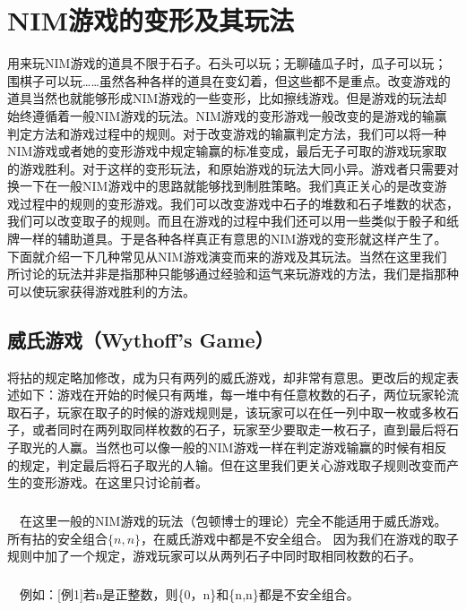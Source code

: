 \documentclass[UTF8,nofonts,cs4size]{ctexrep}
\begin{document}
\chapter{NIM游戏的变形及其玩法}
用来玩NIM游戏的道具不限于石子。石头可以玩；无聊磕瓜子时，瓜子可以玩；围棋子可以玩……虽然各种各样的道具在变幻着，但这些都不是重点。改变游戏的道具当然也就能够形成NIM游戏的一些变形，比如擦线游戏。但是游戏的玩法却始终遵循着一般NIM游戏的玩法。NIM游戏的变形游戏一般改变的是游戏的输赢判定方法和游戏过程中的规则。对于改变游戏的输赢判定方法，我们可以将一种NIM游戏或者她的变形游戏中规定输赢的标准变成，最后无子可取的游戏玩家取的游戏胜利。对于这样的变形玩法，和原始游戏的玩法大同小异。游戏者只需要对换一下在一般NIM游戏中的思路就能够找到制胜策略。我们真正关心的是改变游戏过程中的规则的变形游戏。我们可以改变游戏中石子的堆数和石子堆数的状态，我们可以改变取子的规则。而且在游戏的过程中我们还可以用一些类似于骰子和纸牌一样的辅助道具。于是各种各样真正有意思的NIM游戏的变形就这样产生了。下面就介绍一下几种常见从NIM游戏演变而来的游戏及其玩法。当然在这里我们所讨论的玩法并非是指那种只能够通过经验和运气来玩游戏的方法，我们是指那种可以使玩家获得游戏胜利的方法。
\section{威氏游戏（Wythoff's Game）}
将拈的规定略加修改，成为只有两列的威氏游戏，却非常有意思。更改后的规定表述如下：游戏在开始的时候只有两堆，每一堆中有任意枚数的石子，两位玩家轮流取石子，玩家在取子的时候的游戏规则是，该玩家可以在任一列中取一枚或多枚石子，或者同时在两列取同样枚数的石子，玩家至少要取走一枚石子，直到最后将石子取光的人赢。当然也可以像一般的NIM游戏一样在判定游戏输赢的时候有相反的规定，判定最后将石子取光的人输。但在这里我们更关心游戏取子规则改变而产生的变形游戏。在这里只讨论前者。
\paragraph{}
\indent\ \
在这里一般的NIM游戏的玩法（包顿博士的理论）完全不能适用于威氏游戏。所有拈的安全组合$\{n, n \}$，在威氏游戏中都是不安全组合。 因为我们在游戏的取子规则中加了一个规定，游戏玩家可以从两列石子中同时取相同枚数的石子。
\paragraph{}
\indent\ \
例如：[例1]若n是正整数，则\{0，n\}和\{n,n\}都是不安全组合。
\end{document}
